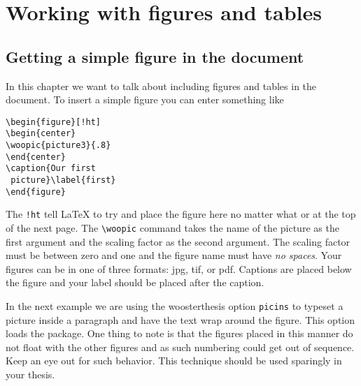 \chapter{Working with figures and tables}\label{graphics}

\section{Getting a simple figure in the document}
In this chapter we want to talk about including figures and tables in the document. To insert a simple figure you can enter something like
\begin{singlespace}\small
\begin{verbatim}
\begin{figure}[!ht]
\begin{center}
\woopic{picture3}{.8}
\end{center}
\caption{Our first
 picture}\label{first}
\end{figure}
\end{verbatim}
\end{singlespace}
\vspace{-1.8 in}
\begin{figure}[!ht]
\end{figure}

The \verb|!ht| tell \LaTeX{} to try and place the figure here no matter what or at the top of the next page. The \verb|\woopic| command takes the name of the picture as the first argument and the scaling factor as the second argument. The scaling factor must be between zero and one and the figure name must have \emph{no spaces}. Your figures can be in one of three formats: jpg, tif, or pdf. Captions are placed below the figure and your label should be placed after the caption.

In the next example we are using the woosterthesis option \verb|picins| to typeset a picture inside a paragraph and have the text wrap around the figure. This option loads the  package. One thing to note is that the figures placed in this manner do not float with the other figures and as such numbering could get out of sequence. Keep an eye out for such behavior.  This technique should be used sparingly in your thesis.

